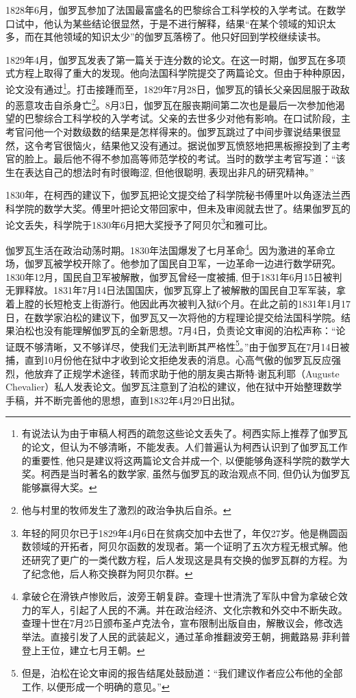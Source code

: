 \documentclass{article}
\begin{document}
1828年6月，伽罗瓦参加了法国最富盛名的巴黎综合工科学校的入学考试。在数学口试中，他认为某些结论很显然，于是不进行解释，结果“在某个领域的知识太多，而在其他领域的知识太少”的伽罗瓦落榜了。他只好回到学校继续读书。

1829年4月，伽罗瓦发表了第一篇关于连分数的论文。在这一时期，伽罗瓦在多项式方程上取得了重大的发现。他向法国科学院提交了两篇论文。但由于种种原因，论文没有通过\footnote{有说法认为由于审稿人柯西的疏忽这些论文丢失了。柯西实际上推荐了伽罗瓦的论文，但认为不够清晰，不能发表。人们普遍认为柯西认识到了伽罗瓦工作的重要性, 他只是建议将这两篇论文合并成一个, 以便能够角逐科学院的数学大奖。柯西是当时著名的数学家, 虽然与伽罗瓦的政治观点不同, 但仍认为伽罗瓦能够赢得大奖。\cite{Wiki-Galois}}。打击接踵而至，1829年7月28日，伽罗瓦的镇长父亲因屈服于政敌的恶意攻击自杀身亡\footnote{他与村里的牧师发生了激烈的政治争执后自杀\cite{Wiki-Galois}。}。8月3日，伽罗瓦在服丧期间第二次也是最后一次参加他渴望的巴黎综合工科学校的入学考试。父亲的去世多少对他有影响。在口试阶段，主考官问他一个对数级数的结果是怎样得来的。伽罗瓦跳过了中间步骤说结果很显然，这令考官很恼火，结果他又没有通过。据说伽罗瓦愤怒地把黑板擦投到了主考官的脸上。最后他不得不参加高等师范学校的考试。当时的数学主考官写道：“该生在表达自己的想法时有时很晦涩, 但他很聪明, 表现出非凡的研究精神。”

1830年，在柯西的建议下，伽罗瓦把论文提交给了科学院秘书傅里叶以角逐法兰西科学院的数学大奖。傅里叶把论文带回家中，但未及审阅就去世了。结果伽罗瓦的论文丢失，科学院于1830年6月把大奖授予了阿贝尔\footnote{年轻的阿贝尔已于1829年4月6日在贫病交加中去世了，年仅27岁。他是椭圆函数领域的开拓者，阿贝尔函数的发现者。第一个证明了五次方程无根式解。他还研究了更广的一类代数方程，后人发现这是具有交换的伽罗瓦群的方程。为了纪念他，后人称交换群为阿贝尔群。}和雅可比\cite{HanXueTao2009}。

伽罗瓦生活在政治动荡时期。1830年法国爆发了七月革命\footnote{拿破仑在滑铁卢惨败后，波旁王朝复辟。查理十世清洗了军队中曾为拿破仑效力的军人，引起了人民的不满。并在政治经济、文化宗教和外交中不断失政。查理十世在7月25日颁布圣卢克法令，宣布限制出版自由，解散议会，修改选举法。直接引发了人民的武装起义，通过革命推翻波旁王朝，拥戴路易$\cdot$菲利普登上王位，建立七月王朝。}。因为激进的革命立场，伽罗瓦被学校开除了。他参加了国民自卫军，一边革命一边进行数学研究。1830年12月，国民自卫军被解散，伽罗瓦曾经一度被捕, 但于1831年6月15日被判无罪释放。1831年7月14日法国国庆，伽罗瓦穿上了被解散的国民自卫军军装，拿着上膛的长短枪支上街游行。他因此再次被判入狱6个月。在此之前的1831年1月17日，在数学家泊松的建议下，伽罗瓦又一次将他的方程理论提交给法国科学院。结果泊松也没有能理解伽罗瓦的全新思想。7月4日，负责论文审阅的泊松声称：“论证既不够清晰，又不够详尽，使我们无法判断其严格性\footnote{但是，泊松在论文审阅的报告结尾处鼓励道：“我们建议作者应公布他的全部工作, 以便形成一个明确的意见。”}。”由于伽罗瓦在7月14日被捕，直到10月份他在狱中才收到论文拒绝发表的消息。心高气傲的伽罗瓦反应强烈，他放弃了正规学术途径，转而求助于他的朋友奥古斯特$\cdot$谢瓦利耶（Auguste Chevalier）私人发表论文。伽罗瓦注意到了泊松的建议，他在狱中开始整理数学手稿，并不断完善他的思想，直到1832年4月29日出狱。
\end{document}
